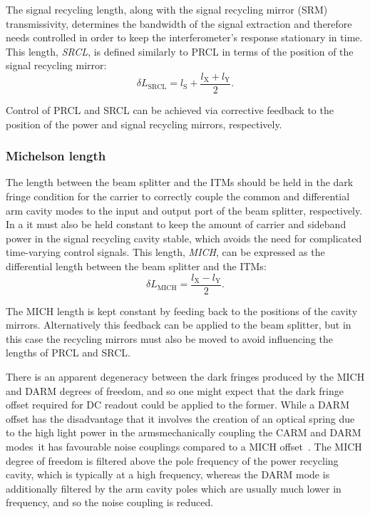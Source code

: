 The signal recycling length, along with the signal recycling mirror (\gls{SRM}) transmissivity, determines the bandwidth of the signal extraction and therefore needs controlled in order to keep the interferometer's response stationary in time. This length, \emph{\gls{SRCL}}, is defined similarly to \gls{PRCL} in terms of the position of the signal recycling mirror:
\begin{equation}
  \label{eq:srcl-length}
  \delta L_{\text{SRCL}} = l_{\text{S}} + \frac{l_{\text{X}} + l_{\text{Y}}}{2}.
\end{equation}

Control of \gls{PRCL} and \gls{SRCL} can be achieved via corrective feedback to the position of the power and signal recycling mirrors, respectively.

\subsubsection{\label{sec:mich-length}Michelson length}
The length between the beam splitter and the \glspl{ITM} should be held in the dark fringe condition for the carrier to correctly couple the common and differential arm cavity modes to the input and output port of the beam splitter, respectively. In a \DRFPMI{} it must also be held constant to keep the amount of carrier and sideband power in the signal recycling cavity stable, which avoids the need for complicated time-varying control signals. This length, \emph{\gls{MICH}}, can be expressed as the differential length between the beam splitter and the \glspl{ITM}:
\begin{equation}
  \label{eq:mich-length}
  \delta L_{\text{MICH}} = \frac{l_{\text{X}} - l_{\text{Y}}}{2}.
\end{equation}

The \gls{MICH} length is kept constant by feeding back to the positions of the cavity mirrors. Alternatively this feedback can be applied to the beam splitter, but in this case the recycling mirrors must also be moved to avoid influencing the lengths of \gls{PRCL} and \gls{SRCL}.

There is an apparent degeneracy between the dark fringes produced by the \gls{MICH} and \gls{DARM} degrees of freedom, and so one might expect that the dark fringe offset required for \gls{DC} readout could be applied to the former. While a \gls{DARM} offset has the disadvantage that it involves the creation of an optical spring due to the high light power in the arms\textemdash mechanically coupling the \gls{CARM} and \gls{DARM} modes~\cite{Heidmann2011, Vostrosablin2014}\textemdash it has favourable noise couplings compared to a \gls{MICH} offset~\cite{Vajente2011}. The \gls{MICH} degree of freedom is filtered above the pole frequency of the power recycling cavity, which is typically at a high frequency, whereas the \gls{DARM} mode is additionally filtered by the arm cavity poles which are usually much lower in frequency, and so the noise coupling is reduced.

